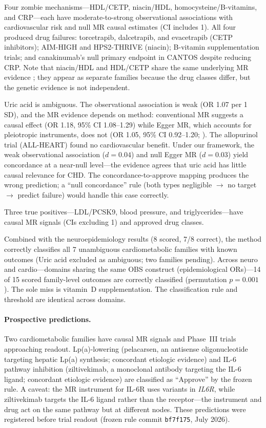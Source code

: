 \documentclass[11pt]{article}
\begin{document}
Four zombie mechanisms---HDL/CETP, niacin/HDL, homocysteine/B-vitamins, and CRP---each have moderate-to-strong observational associations with cardiovascular risk and null MR causal estimates (CI includes 1). All four produced drug failures: torcetrapib, dalcetrapib, and evacetrapib (CETP inhibitors); AIM-HIGH and HPS2-THRIVE (niacin); B-vitamin supplementation trials; and canakinumab's null primary endpoint in CANTOS despite reducing CRP. Note that niacin/HDL and HDL/CETP share the same underlying MR evidence \cite{voight2012}; they appear as separate families because the drug classes differ, but the genetic evidence is not independent.

Uric acid is ambiguous. The observational association is weak (OR 1.07 per 1 SD), and the MR evidence depends on method: conventional MR suggests a causal effect (OR 1.18, 95\% CI 1.08--1.29) while Egger MR, which accounts for pleiotropic instruments, does not (OR 1.05, 95\% CI 0.92--1.20; \cite{white2016}). The allopurinol trial (ALL-HEART) found no cardiovascular benefit. Under our framework, the weak observational association ($d = 0.04$) and null Egger MR ($d = 0.03$) yield concordance at a near-null level---the evidence agrees that uric acid has little causal relevance for CHD. The concordance-to-approve mapping produces the wrong prediction; a ``null concordance'' rule (both types negligible $\to$ no target $\to$ predict failure) would handle this case correctly.

Three true positives---LDL/PCSK9, blood pressure, and triglycerides---have causal MR signals (CIs excluding 1) and approved drug classes.

Combined with the neuroepidemiology results (8 scored, 7/8 correct), the method correctly classifies all 7 unambiguous cardiometabolic families with known outcomes (Uric acid excluded as ambiguous; two families pending). Across neuro and cardio---domains sharing the same OBS construct (epidemiological ORs)---14 of 15 scored family-level outcomes are correctly classified (permutation $p = 0.001$). The sole miss is vitamin~D supplementation. The classification rule and threshold are identical across domains.

\paragraph{Prospective predictions.}
Two cardiometabolic families have causal MR signals and Phase~III trials approaching readout. Lp(a)-lowering (pelacarsen, an antisense oligonucleotide targeting hepatic Lp(a) synthesis; concordant etiologic evidence) and IL-6 pathway inhibition (ziltivekimab, a monoclonal antibody targeting the IL-6 ligand; concordant etiologic evidence) are classified as ``Approve'' by the frozen rule. A caveat: the MR instrument for IL-6R uses variants in \emph{IL6R}, while ziltivekimab targets the IL-6 ligand rather than the receptor---the instrument and drug act on the same pathway but at different nodes. These predictions were registered before trial readout (frozen rule commit \texttt{bf7f175}, July 2026).
\end{document}
